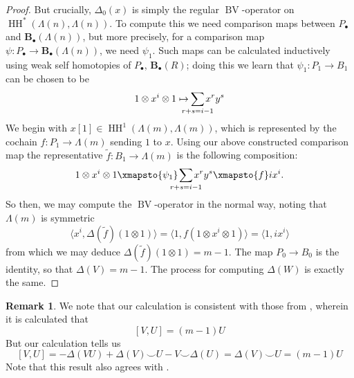 \documentclass{article}
\newcommand{\HH}{\operatorname{HH}}
\newcommand{\bv}{\operatorname{BV}}
\theoremstyle{plain}
\theoremstyle{definition}
\newtheorem{remark}[theorem]{Remark}
\begin{document}
\begin{proof}
But crucially, $\Delta_0(x)$ is simply the regular $\bv$-operator on $\HH^*(\Lambda(n),\Lambda(n))$. To compute this we need comparison maps between $P_\bullet$ and $\mathbf{B}_\bullet(\Lambda(n))$, but more precisely, for a comparison map $\psi:P_\bullet \rightarrow \mathbf{B}_\bullet(\Lambda(n))$, we need $\psi_1$. Such maps can be calculated inductively using weak self homotopies of $P_\bullet$, $\mathbf{B}_\bullet(R)$; doing this we learn that $\psi_1:P_1 \rightarrow B_1$ can be chosen to be
$$1 \otimes x^i \otimes 1 \mapsto \hspace{-10pt}\sum_{r+s=i-1} \hspace{-10pt} x^ry^s$$
We begin with $x[1] \in \HH^1(\Lambda(m),\Lambda(m))$, which is represented by the cochain $f:P_1 \rightarrow \Lambda(m)$ sending $1$ to $x$. Using our above constructed comparison map the representative $\tilde{f}:B_1 \rightarrow \Lambda(m)$ is the following composition:
$$ 1\otimes x^i \otimes 1 \xmapsto{\psi	_1} \hspace{-10pt}\sum_{r+s=i-1}\hspace{-10pt} x^ry^s \xmapsto{f} ix^i.$$
So then, we may compute the $\bv$-operator in the normal way, noting that $\Lambda(m)$ is symmetric 
$$\langle x^i, \Delta(\tilde{f})(1 \otimes 1) \rangle = \langle 1, f(1 \otimes x^i \otimes 1) \rangle = \langle 1, ix^i \rangle$$
from which we may deduce $\Delta(\tilde{f})(1 \otimes 1) = m-1$. The map $P_0 \rightarrow B_0$ is the identity, so that $\Delta(V)=m-1$. The process for computing $\Delta(W)$ is exactly the same.
\end{proof}
\begin{remark} We note that our calculation is consistent with those from \cite{BriggsWitherspoon}, wherein it is calculated that
$$[V,U] = (m-1)U$$
But our calculation tells us
$$[V,U] = -\Delta(VU) + \Delta(V) \smile U - V \smile \Delta(U) = \Delta(V) \smile U = (m-1)U$$
Note that this result also agrees with \cite{hou}.
\end{remark}


\end{document}

